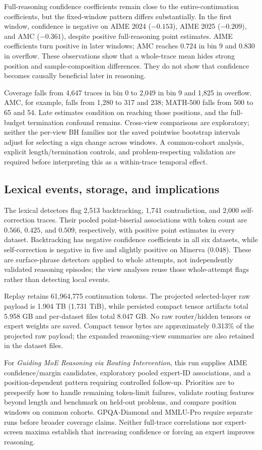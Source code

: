 Full-reasoning confidence coefficients remain close to the entire-continuation
coefficients, but the fixed-window pattern differs substantially. In the first
window, confidence is negative on AIME 2024 ($-0.153$), AIME 2025 ($-0.209$),
and AMC ($-0.361$), despite positive full-reasoning point estimates. AIME
coefficients turn positive in later windows; AMC reaches $0.724$ in bin 9
and $0.830$ in overflow. These observations show that a whole-trace mean
hides strong position and sample-composition differences. They do not show
that confidence becomes causally beneficial later in reasoning.

Coverage falls from 4,647 traces in bin 0 to 2,049 in bin 9 and 1,825 in
overflow. AMC, for example, falls from 1,280 to 317 and 238; MATH-500 falls
from 500 to 65 and 54. Late estimates condition on reaching those positions,
and the full-budget termination confound remains. Cross-view comparisons are
exploratory; neither the per-view BH families nor the saved pointwise
bootstrap intervals adjust for selecting a sign change across windows. A
common-cohort analysis, explicit length/termination controls, and
problem-respecting validation are required before interpreting this as a
within-trace temporal effect.

\subsection{Lexical events, storage, and implications}

The lexical detectors flag 2,513 backtracking, 1,741 contradiction, and 2,000
self-correction traces. Their pooled point-biserial associations with token
count are $0.566$, $0.425$, and $0.509$, respectively, with positive point
estimates in every dataset. Backtracking has negative confidence coefficients
in all six datasets, while self-correction is negative in five and slightly
positive on Minerva ($0.048$). These are surface-phrase detectors applied to
whole attempts, not independently validated reasoning episodes; the view
analyses reuse those whole-attempt flags rather than detecting local events.

Replay retains 61,964,775 continuation tokens. The projected selected-layer
raw payload is 1.904 TB (1.731 TiB), while persisted compact tensor artifacts
total 5.958 GB and per-dataset files total 8.047 GB. No raw router/hidden
tensors or expert weights are saved. Compact tensor bytes are approximately
0.313\% of the projected raw payload; the expanded reasoning-view summaries
are also retained in the dataset files.

For \emph{Guiding MoE Reasoning via Routing Intervention}, this run supplies
AIME confidence/margin candidates, exploratory pooled expert-ID associations,
and a position-dependent pattern requiring controlled follow-up. Priorities
are to prespecify how to handle remaining token-limit failures, validate
routing features beyond length and benchmark on held-out problems, and
compare position windows on common cohorts. GPQA-Diamond and MMLU-Pro require
separate runs before broader coverage claims. Neither full-trace correlations
nor expert-screen maxima establish that increasing confidence or forcing an
expert improves reasoning.
